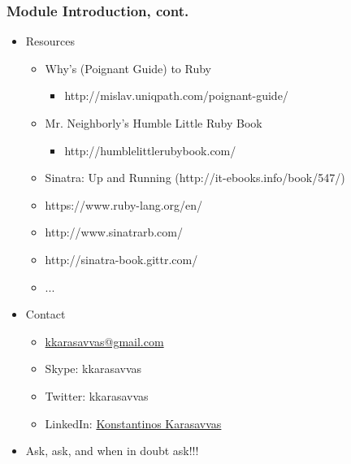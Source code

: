 \documentclass{beamer}
\begin{document}
\begin{frame}\frametitle{Module Introduction, cont.} 
  \begin{itemize}
    \item Resources
    \begin{itemize}
      \item Why's (Poignant Guide) to Ruby
      \begin{itemize}
        \item http://mislav.uniqpath.com/poignant-guide/
      \end{itemize}
      \item Mr. Neighborly's Humble Little Ruby Book
      \begin{itemize}
        \item http://humblelittlerubybook.com/
      \end{itemize}
      \item Sinatra: Up and Running (http://it-ebooks.info/book/547/)
      \item https://www.ruby-lang.org/en/
      \item http://www.sinatrarb.com/
      \item http://sinatra-book.gittr.com/
      \item ...
    \end{itemize}
    \pause
    \item Contact
    \begin{itemize}
      \item \href{mailto:kkarasavvas@gmail.com}{kkarasavvas@gmail.com}
      \item Skype: kkarasavvas
      \item Twitter: kkarasavvas
      \item LinkedIn: \href{http://www.linkedin.com/pub/konstantinos-karasavvas/14/64b/14b}{Konstantinos Karasavvas}
    \end{itemize}
    \pause
    \item Ask, ask, and when in doubt ask!!!
    
  \end{itemize}
\end{frame}
\end{document}
